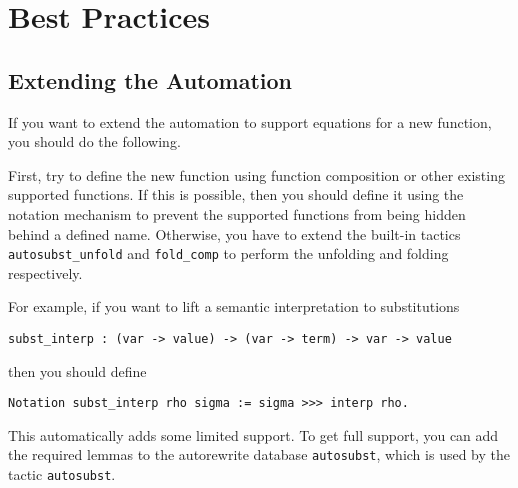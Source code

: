 \documentclass{scrartcl}
\newcommand{\lst}{\lstinline}
\begin{document}
\section{Best Practices}
\label{sec:best-practices}



\subsection{Extending the Automation}
\label{sec:ext-auto}

If you want to extend the automation to support equations for a new function, you should do the following.

First, try to define the new function using function composition or other existing supported functions.
If this is possible, then you should define it using the notation mechanism to prevent the supported functions from being hidden behind a defined name. Otherwise, you have to extend the built-in tactics \lst$autosubst_unfold$ and \lst$fold_comp$ to perform the unfolding and folding respectively.

For example, if you want to lift a semantic interpretation to substitutions 
\begin{lstlisting}
subst_interp : (var -> value) -> (var -> term) -> var -> value  
\end{lstlisting}
then you should define
\begin{lstlisting}
Notation subst_interp rho sigma := sigma >>> interp rho.
\end{lstlisting}
This automatically adds some limited support. To get full support, you can add the required lemmas to the autorewrite database \lst$autosubst$, which is used by the tactic \lst$autosubst$.



\end{document}
